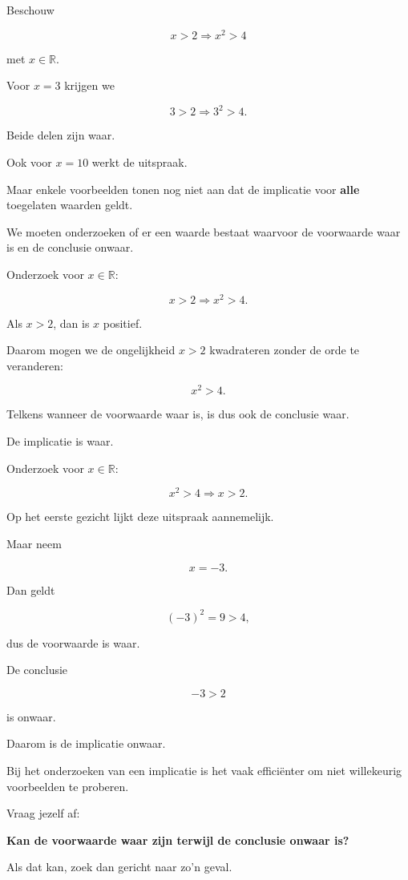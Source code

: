 \documentclass{ximera}
\begin{document}
Beschouw

\[
x>2\Rightarrow x^2>4
\]

met $x\in\mathbb{R}$.

Voor $x=3$ krijgen we

\[
3>2\Rightarrow 3^2>4.
\]

Beide delen zijn waar.

Ook voor $x=10$ werkt de uitspraak.

Maar enkele voorbeelden tonen nog niet aan dat de implicatie voor
\textbf{alle} toegelaten waarden geldt.

We moeten onderzoeken of er een waarde bestaat waarvoor de voorwaarde
waar is en de conclusie onwaar.


\begin{voorbeeld}

Onderzoek voor $x\in\mathbb{R}$:

\[
x>2\Rightarrow x^2>4.
\]

Als $x>2$, dan is $x$ positief.

Daarom mogen we de ongelijkheid $x>2$ kwadrateren zonder de orde te
veranderen:

\[
x^2>4.
\]

Telkens wanneer de voorwaarde waar is, is dus ook de conclusie waar.

De implicatie is waar.

\end{voorbeeld}


\begin{voorbeeld}

Onderzoek voor $x\in\mathbb{R}$:

\[
x^2>4\Rightarrow x>2.
\]

Op het eerste gezicht lijkt deze uitspraak aannemelijk.

Maar neem

\[
x=-3.
\]

Dan geldt

\[
(-3)^2=9>4,
\]

dus de voorwaarde is waar.

De conclusie

\[
-3>2
\]

is onwaar.

Daarom is de implicatie onwaar.

\end{voorbeeld}


\begin{opmerking}

Bij het onderzoeken van een implicatie is het vaak efficiënter om niet
willekeurig voorbeelden te proberen.

Vraag jezelf af:

\begin{center}
\textbf{Kan de voorwaarde waar zijn terwijl de conclusie onwaar is?}
\end{center}

Als dat kan, zoek dan gericht naar zo'n geval.

\end{opmerking}
\end{document}
